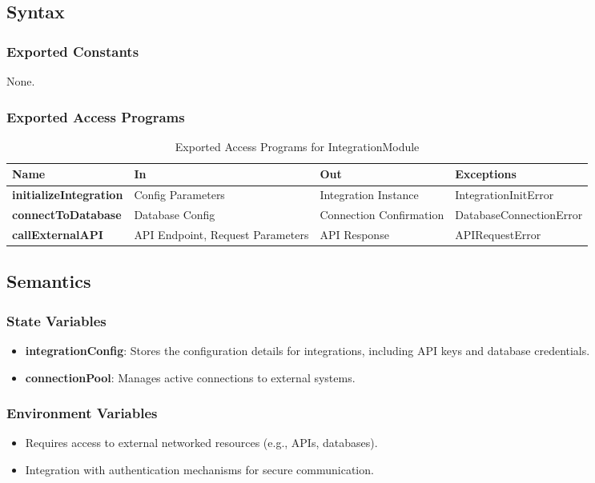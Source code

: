 \documentclass[12pt, titlepage]{article}
\begin{document}
\subsection{Syntax}

\subsubsection{Exported Constants}
None.

\subsubsection{Exported Access Programs}

\begin{table}[h!]
\centering
\begin{tabular}{|p{4cm}|p{5cm}|p{5cm}|p{4cm}|}
    \hline
    \textbf{Name} & \textbf{In} & \textbf{Out} & \textbf{Exceptions} \\
    \hline
    \textbf{initializeIntegration} & Config Parameters & Integration Instance & IntegrationInitError \\
    \hline
    \textbf{connectToDatabase} & Database Config & Connection Confirmation & DatabaseConnectionError \\
    \hline
    \textbf{callExternalAPI} & API Endpoint, Request Parameters & API Response & APIRequestError \\
    \hline
\end{tabular}
\caption{Exported Access Programs for IntegrationModule}
\label{table:integrationModule}
\end{table}

\subsection{Semantics}

\subsubsection{State Variables}
\begin{itemize}
    \item \textbf{integrationConfig}: Stores the configuration details for integrations, including API keys and database credentials.
    \item \textbf{connectionPool}: Manages active connections to external systems.
\end{itemize}

\subsubsection{Environment Variables}
\begin{itemize}
    \item Requires access to external networked resources (e.g., APIs, databases).
    \item Integration with authentication mechanisms for secure communication.
\end{itemize}
\end{document}
